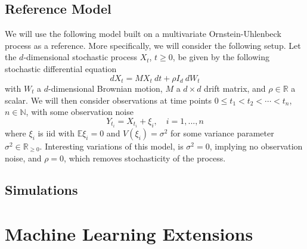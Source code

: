 \documentclass[11pt, a4paper]{memoir}
\theoremstyle{break}
\theoremstyle{break}
\theoremstyle{nonumberplain}
\begin{document}
\section{Reference Model}
We will use the following model built on a multivariate Ornstein-Uhlenbeck process as a reference. More specifically, we will consider the following setup. Let the $d$-dimensional stochastic process $X_t$, $t\geqslant 0$, be given by the following stochastic differential equation
$$dX_t=M X_t\ dt+\rho I_d\ dW_t$$
with $W_t$ a $d$-dimensional  Brownian motion, $M$ a $d\times d$ drift matrix, and $\rho\in \mathbb{R}$ a scalar. We will then consider observations at time points $0\leqslant t_1<t_2<\cdots <t_n$, $n\in \mathbb{N}$, with some observation noise
$$Y_{t_i}=X_{t_i}+\xi_i,\quad i=1,...,n$$
where $\xi_i$ is iid with $\mathbb{E} \xi_i=0$ and $V(\xi_i)=\sigma^2$ for some variance parameter $\sigma^2\in \mathbb{R}_{\geqslant 0}$. Interesting variations of this model, is $\sigma^2=0$, implying no observation noise, and $\rho=0$, which removes stochasticity of the process.

\section{Simulations}
 

\chapter{Machine Learning Extensions}


\end{document}
